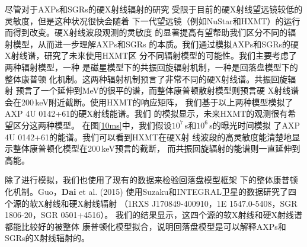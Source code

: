 尽管对于AXPs和SGRs的硬X射线辐射的研究
受限于目前的硬X射线望远镜较低的灵敏度，但是这种状况很快会随着
下一代望远镜（例如NuStar和HXMT）的运行而得到改变。硬X射线波段观测的灵敏度
的显著提高有望帮助我们区分不同的辐射模型，从而进一步理解AXPs和SGRs
的本质。我们通过模拟AXPs和SGRs的硬X射线谱，研究了未来使用HXMT区
分不同辐射模型的可能性。我们主要考虑了两种辐射模型，一种
是磁星模型下的共振回旋辐射机制，一种是回落盘模型下的整体康普顿
化机制。这两种辐射机制预言了非常不同的硬X射线谱。共振回旋辐射
预言了一个延伸到MeV的很平的谱，而整体康普顿散射模型则预言硬
X射线谱会在200\,keV附近截断。使用HXMT的响应矩阵，
我们基于以上两种模型模拟了AXP 4U 0142+61的硬X射线能谱。我们
的模拟显示，未来HXMT的观测很有希望区分这两种模型。
在图\ref{10ms}中，我们假设$10^7$\,s和$10^6$\,s的曝光时间模拟
了AXP 4U 0142+61的能谱。我们可以看到HXMT在硬X射
线波段的高灵敏度能清楚地显示整体康普顿化模型在200\,keV预言的截断，
而共振回旋辐射的能谱则一直延伸到高能。

除了进行模拟，我们也使用了现有的数据来检验回落盘模型框架
下的整体康普顿化机制。Guo，\textbf{Dai} et al. (2015)\supercite{gdl+14}
使用Suzaku和INTEGRAL卫星的数据研究了四个源的软X射线和硬X射线辐射
（1RXS J170849-400910，1E 1547.0-5408，SGR 1806-20，SGR 0501+4516）。
我们的结果显示，这四个源的软X射线和硬X射线谱都能比较好的被整体
康普顿化模型拟合，说明回落盘模型是可以解释AXPs和SGRs的X射线辐射的。

